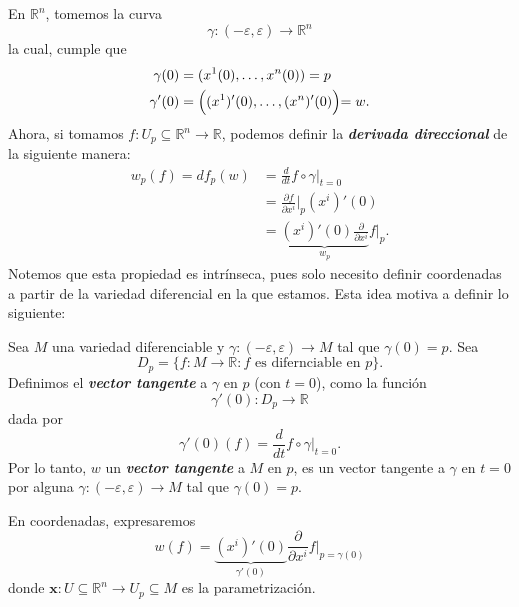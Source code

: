 \noindent En $\mathbb{R}^n$, tomemos la curva 
\begin{equation*}
    \gamma\colon(-\varepsilon,\varepsilon)\to\mathbb{R}^n
\end{equation*}
la cual, cumple que
\begin{align*}
    \gamma(0)&=(x^1(0),\dots,x^n(0))=p\\
    \gamma'(0)&=\Bigl((x^1)'(0),\dots,(x^n)'(0)\Bigl)=w.
\end{align*}
Ahora, si tomamos $f\colon U_p\subseteq\mathbb{R}^n\to\mathbb{R}$, podemos definir la \textit{\textbf{derivada direccional}} de la siguiente manera:
\begin{align*}
    w_p(f)=df_p(w)&=\frac{d}{dt}f\circ\gamma\Big|_{t=0}\\
    &=\frac{\partial f}{\partial x^i}\Big|_p(x^i)'(0)\\
    &=\underbrace{(x^i)'(0)\frac{\partial}{\partial x^i}}_{w_p}f\Big|_p.
\end{align*}
Notemos que esta propiedad es intr\'inseca, pues solo necesito definir coordenadas a partir de la variedad diferencial en la que estamos. Esta idea motiva a definir lo siguiente:

\begin{definition}
Sea $M$ una variedad diferenciable y $\gamma\colon(-\varepsilon,\varepsilon)\to M$ tal que $\gamma(0)=p$. Sea 
\begin{equation*}
    D_p=\{f\colon M\to\mathbb{R}\colon\text{$f$ es difernciable en $p$}\}.
\end{equation*}
Definimos el \textit{\textbf{vector tangente}} a $\gamma$ en $p$ (con $t=0$), como la funci\'on
\begin{equation*}
    \gamma'(0)\colon D_p\to\mathbb{R}
\end{equation*}
dada por 
\begin{equation*}
    \gamma'(0)(f)=\frac{d}{dt}f\circ\gamma\Big|_{t=0}.
\end{equation*}
Por lo tanto, $w$ un \textit{\textbf{vector tangente}} a $M$ en $p$, es un vector tangente a $\gamma$ en $t=0$ por alguna $\gamma\colon(-\varepsilon,\varepsilon)\to M$ tal que $\gamma(0)=p$.
\end{definition}

\begin{notation}
En coordenadas, expresaremos 
\begin{equation}
    w(f)=\underbrace{(x^i)'(0)}_{\gamma'(0)}\frac{\partial}{\partial x^i}f\Big|_{p=\gamma(0)}
\end{equation}
donde $\mathbf{x}\colon U\subseteq\mathbb{R}^n\to U_p\subseteq M$ es la parametrizaci\'on.
\end{notation}

